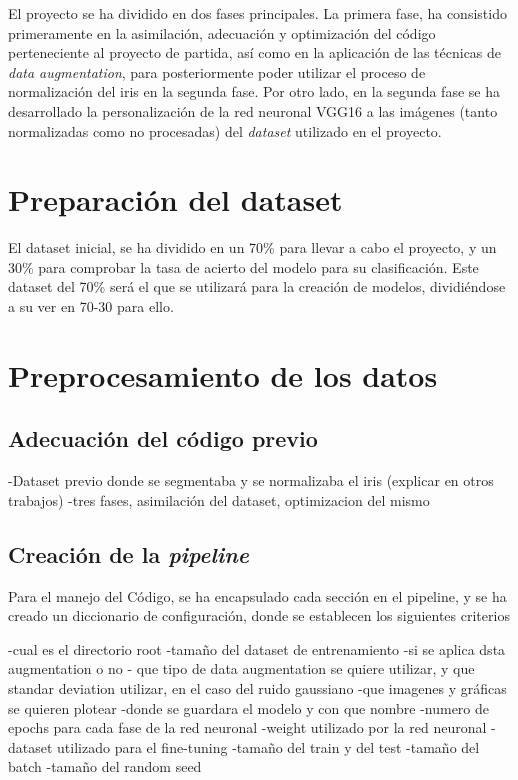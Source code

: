  \label{capitulo5}

El proyecto se ha dividido en dos fases principales. La primera fase, ha consistido primeramente en la asimilación, adecuación y optimización del código perteneciente
al proyecto de partida\cite{tfg_iris_2020}, así como en la aplicación de las técnicas de \textit{data augmentation}, para posteriormente poder utilizar el proceso de normalización del iris en la segunda fase. 
Por otro lado, en la segunda fase se ha desarrollado la personalización de la red neuronal VGG16 a las imágenes (tanto normalizadas como no procesadas) del \textit{dataset} utilizado en el proyecto.


\section{Preparación del dataset}

El dataset inicial, se ha dividido en un 70\% para llevar a cabo el proyecto, y un 30\% para comprobar la tasa de acierto del modelo para su clasificación. 
Este dataset del 70\% será el que se utilizará para la creación de modelos, dividiéndose a su ver en 70-30 para ello. 

\section{Preprocesamiento de los datos}

\subsection{Adecuación del código previo}

-Dataset previo donde se segmentaba y se normalizaba el iris (explicar en otros trabajos) 
-tres fases, asimilación del dataset, optimizacion del mismo

\subsection{Creación de la \textit{pipeline}}

Para el manejo del Código, se ha encapsulado cada sección en el pipeline, y se ha creado un diccionario de configuración, donde se establecen los siguientes criterios

-cual es el directorio root
-tamaño del dataset de entrenamiento
-si se aplica dsta augmentation o no
- que tipo de data augmentation se quiere utilizar, y que standar deviation utilizar, en el caso del ruido gaussiano
-que imagenes y gráficas se quieren plotear
-donde se guardara el modelo y con que nombre
-numero de epochs para cada fase de la red neuronal  
-weight utilizado por la red neuronal
- dataset utilizado para el fine-tuning
-tamaño del train y del test
-tamaño del batch
-tamaño del random seed

